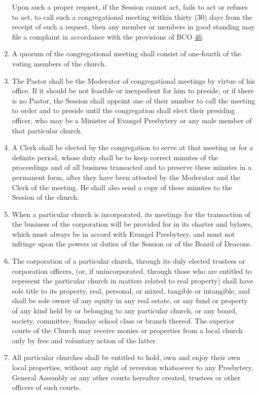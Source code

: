 \documentclass[
]{book}
\begin{document}
\begin{enumerate}
  Upon such a proper request, if the Session cannot act, fails to act or refuses to act, to call such a congregational meeting within thirty (30) days from the receipt of such a request, then any member or members in good standing may file a complaint in accordance with the provisions of BCO \protect\hyperlink{46}{46}.
\item
  A quorum of the congregational meeting shall consist of one-fourth of the voting members of the church.
\item
  The Pastor shall be the Moderator of congregational meetings by virtue of his office. If it should be not feasible or inexpedient for him to preside, or if there is no Pastor, the Session shall appoint one of their number to call the meeting to order and to preside until the congregation shall elect their presiding officer, who may be a Minister of Evangel Presbytery or any male member of that particular church.
\item
  A Clerk shall be elected by the congregation to serve at that meeting or for a definite period, whose duty shall be to keep correct minutes of the proceedings and of all business transacted and to preserve these minutes in a permanent form, after they have been attested by the Moderator and the Clerk of the meeting. He shall also send a copy of these minutes to the Session of the church.
\item
  When a particular church is incorporated, its meetings for the transaction of the business of the corporation will be provided for in its charter and bylaws, which must always be in accord with Evangel Presbytery, and must not infringe upon the powers or duties of the Session or of the Board of Deacons.
\item
  The corporation of a particular church, through its duly elected trustees or corporation officers, (or, if unincorporated, through those who are entitled to represent the particular church in matters related to real property) shall have sole title to its property, real, personal, or mixed, tangible or intangible, and shall be sole owner of any equity in any real estate, or any fund or property of any kind held by or belonging to any particular church, or any board, society, committee, Sunday school class or branch thereof. The superior courts of the Church may receive monies or properties from a local church only by free and voluntary action of the latter.
\item
  All particular churches shall be entitled to hold, own and enjoy their own local properties, without any right of reversion whatsoever to any Presbytery, General Assembly or any other courts hereafter created, trustees or other officers of such courts.

\end{enumerate}
\end{document}
